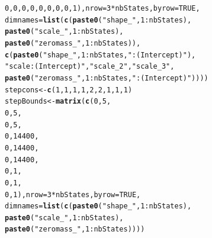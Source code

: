 \documentclass[12pt]{article}\usepackage[]{graphicx}\usepackage[]{color}
\makeatletter
\newcommand{\hlnum}[1]{\textcolor[rgb]{0.686,0.059,0.569}{#1}}%
\newcommand{\hlstr}[1]{\textcolor[rgb]{0.192,0.494,0.8}{#1}}%
\newcommand{\hlopt}[1]{\textcolor[rgb]{0,0,0}{#1}}%
\newcommand{\hlstd}[1]{\textcolor[rgb]{0.345,0.345,0.345}{#1}}%
\newcommand{\hlkwb}[1]{\textcolor[rgb]{0.69,0.353,0.396}{#1}}%
\newcommand{\hlkwc}[1]{\textcolor[rgb]{0.333,0.667,0.333}{#1}}%
\newcommand{\hlkwd}[1]{\textcolor[rgb]{0.737,0.353,0.396}{\textbf{#1}}}%
\newenvironment{kframe}{%
 \def\at@end@of@kframe{}%
 \ifinner\ifhmode%
  \def\at@end@of@kframe{\end{minipage}}%
  \begin{minipage}{\columnwidth}%
 \fi\fi%
 \def\FrameCommand##1{\hskip\@totalleftmargin \hskip-\fboxsep
 \colorbox{shadecolor}{##1}\hskip-\fboxsep
     \hskip-\linewidth \hskip-\@totalleftmargin \hskip\columnwidth}%
 \MakeFramed {\advance\hsize-\width
   \@totalleftmargin\z@ \linewidth\hsize
   \@setminipage}}%
 {\par\unskip\endMakeFramed%
 \at@end@of@kframe}
\newenvironment{knitrout}{}{} %
\makeatother
\begin{document}
\begin{knitrout}
\begin{kframe}
\begin{alltt}
                 \hlnum{0}\hlstd{,}\hlnum{0}\hlstd{,}\hlnum{0}\hlstd{,}\hlnum{0}\hlstd{,}\hlnum{0}\hlstd{,}\hlnum{0}\hlstd{,}\hlnum{0}\hlstd{,}\hlnum{0}\hlstd{,}\hlnum{1}\hlstd{),}\hlkwc{nrow}\hlstd{=}\hlnum{3}\hlopt{*}\hlstd{nbStates,}\hlkwc{byrow}\hlstd{=}\hlnum{TRUE}\hlstd{,}
        \hlkwc{dimnames}\hlstd{=}\hlkwd{list}\hlstd{(}\hlkwd{c}\hlstd{(}\hlkwd{paste0}\hlstd{(}\hlstr{"shape_"}\hlstd{,}\hlnum{1}\hlopt{:}\hlstd{nbStates),}
                        \hlkwd{paste0}\hlstd{(}\hlstr{"scale_"}\hlstd{,}\hlnum{1}\hlopt{:}\hlstd{nbStates),}
                        \hlkwd{paste0}\hlstd{(}\hlstr{"zeromass_"}\hlstd{,}\hlnum{1}\hlopt{:}\hlstd{nbStates)),}
                      \hlkwd{c}\hlstd{(}\hlkwd{paste0}\hlstd{(}\hlstr{"shape_"}\hlstd{,}\hlnum{1}\hlopt{:}\hlstd{nbStates,}\hlstr{":(Intercept)"}\hlstd{),}
                        \hlstr{"scale:(Intercept)"}\hlstd{,}\hlstr{"scale_2"}\hlstd{,}\hlstr{"scale_3"}\hlstd{,}
                        \hlkwd{paste0}\hlstd{(}\hlstr{"zeromass_"}\hlstd{,}\hlnum{1}\hlopt{:}\hlstd{nbStates,}\hlstr{":(Intercept)"}\hlstd{))))}
\hlstd{stepcons}\hlkwb{<-}\hlkwd{c}\hlstd{(}\hlnum{1}\hlstd{,}\hlnum{1}\hlstd{,}\hlnum{1}\hlstd{,}\hlnum{1}\hlstd{,}\hlnum{2}\hlstd{,}\hlnum{2}\hlstd{,}\hlnum{1}\hlstd{,}\hlnum{1}\hlstd{,}\hlnum{1}\hlstd{)}
\hlstd{stepBounds}\hlkwb{<-}\hlkwd{matrix}\hlstd{(}\hlkwd{c}\hlstd{(}\hlnum{0}\hlstd{,}\hlnum{5}\hlstd{,}
                     \hlnum{0}\hlstd{,}\hlnum{5}\hlstd{,}
                     \hlnum{0}\hlstd{,}\hlnum{5}\hlstd{,}
                     \hlnum{0}\hlstd{,}\hlnum{14400}\hlstd{,}
                     \hlnum{0}\hlstd{,}\hlnum{14400}\hlstd{,}
                     \hlnum{0}\hlstd{,}\hlnum{14400}\hlstd{,}
                     \hlnum{0}\hlstd{,}\hlnum{1}\hlstd{,}
                     \hlnum{0}\hlstd{,}\hlnum{1}\hlstd{,}
                     \hlnum{0}\hlstd{,}\hlnum{1}\hlstd{),}\hlkwc{nrow}\hlstd{=}\hlnum{3}\hlopt{*}\hlstd{nbStates,}\hlkwc{byrow}\hlstd{=}\hlnum{TRUE}\hlstd{,}
                    \hlkwc{dimnames}\hlstd{=}\hlkwd{list}\hlstd{(}\hlkwd{c}\hlstd{(}\hlkwd{paste0}\hlstd{(}\hlstr{"shape_"}\hlstd{,}\hlnum{1}\hlopt{:}\hlstd{nbStates),}
                                    \hlkwd{paste0}\hlstd{(}\hlstr{"scale_"}\hlstd{,}\hlnum{1}\hlopt{:}\hlstd{nbStates),}
                                    \hlkwd{paste0}\hlstd{(}\hlstr{"zeromass_"}\hlstd{,}\hlnum{1}\hlopt{:}\hlstd{nbStates))))}
\end{alltt}
\end{kframe}
\end{knitrout}
\end{document}
